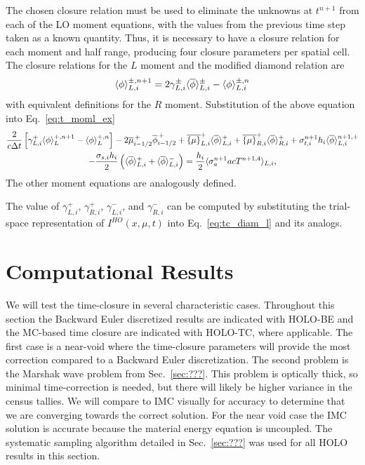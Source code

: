 The chosen closure relation must be used to eliminate the unknowns at $t^{n+1}$ from each
of the LO moment equations, with the values from the previous time step taken as a known quantity.  Thus, it is necessary to have a closure relation for each moment and half
range, producing four closure parameters per spatial cell.  The closure relations for the
$L$ moment and the modified diamond relation are
\begin{equation}\label{eq:tc_diam_l}
    \langle \phi \rangle_{L,i}^{\pm,n+1} = 2 \gamma_{L,i}^{\pm}\langle \overline\phi \rangle_{L,i}^{\pm} -
    \langle \phi \rangle_{L,i}^{\pm,n}
\end{equation}
with equivalent definitions for the $R$ moment.  Substitution of the above equation into
Eq.~\eqref{eq:t_moml_ex}
\begin{multline}
    \frac{2}{c\Delta t}\left[ \gamma_{L,i}^{+} \langle \phi \rangle_L^{+,n+1} - \langle \phi \rangle_L^{+,n} \right]
    -2\overline {\mu}_{i-1/2}^{\,+} \overline \phi_{i-1/2}^{\,+} + \overline{\left\{ \mu \right\}}_{L,i}^{+}
  \langle \overline{\phi} \rangle_{L,i}^{+}
  +  \overline{\left\{ \mu \right\}}_{R,i}^{+}
  \langle \overline{\phi} \rangle_{R,i}^{+} +  \sigma_{t,i}^{n+1} h_i 
  \langle \overline\phi \rangle_{L,i}^{n+1,+} \\-  \frac{\sigma_{s,i} h_i}{2} \left( \langle \overline{\phi} \rangle_{L,i}^{+} +
  \langle \overline{\phi} \rangle_{L,i}^{-}\right) = \frac{h_i}{2} \langle \sigma_a^{n+1} a c T^{n+1,4} \rangle_{L,i},
\end{multline}
The other moment equations are analogously defined.  

The value of $\gamma_{L,i}^+$, $\gamma_{R,i}^+$, $\gamma_{L,i}^-$, and $\gamma_{R,i}^-$
can be computed by substituting the trial-space representation of $I^{HO}(x,\mu,t)$ into
Eq.~\eqref{eq:tc_diam_l} and its analogs.


\section{Computational Results}

We will test the time-closure in several characteristic cases.  Throughout this section
the Backward Euler discretized results are indicated with HOLO-BE and the MC-based time
closure are indicated with HOLO-TC, where applicable.  The first case is a
near-void where the time-closure parameters will provide the most correction compared to a
Backward Euler discretization.  The second problem is the Marshak wave problem from
Sec.~\ref{sec:???}.  This problem is optically thick, so minimal time-correction is
needed, but there will likely be higher variance in the census tallies. We will compare to IMC
visually for accuracy to determine that we are converging towards the correct solution.
For the near void case the IMC solution is accurate because the material energy equation
is uncoupled.  The systematic sampling algorithm detailed in Sec.~\ref{sec:???} was used for all HOLO results in this
section.

